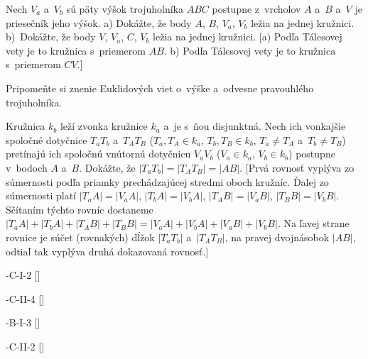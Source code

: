 {
Nech $V_a$ a~$V_b$ sú päty výšok trojuholníka $ABC$ postupne z~vrcholov
$A$ a~$B$ a~$V$ je priesečník jeho výšok. a) Dokážte, že body $A$, $B$,
$V_a$, $V_b$ ležia na jednej kružnici. b)~Dokážte, že body $V$, $V_a$, $C$,
$V_b$ ležia na jednej kružnici. [a) Podľa Tálesovej vety je to kružnica
s~priemerom $AB$. b) Podľa Tálesovej vety je to kružnica s~priemerom
$CV$.]

Pripomeňte si znenie Euklidových viet o~výške a~odvesne pravouhlého
trojuholníka.

Kružnica $k_b$ leží zvonka kružnice $k_a$ a~je s~ňou disjunktná. Nech
ich vonkajšie spoločné dotyčnice $T_aT_b$ a~$T_AT_B$ ($T_a, T_A\in k_a$,
$T_b, T_B\in k_b$, $T_a\ne T_A$ a~$T_b\ne T_B$) pretínajú ich
spoločnú vnútornú dotyčnicu $V_aV_b$ ($V_a\in k_a$, $V_b\in k_b$) postupne
v~bodoch $A$ a~$B$. Dokážte, že $|T_aT_b|= |T_AT_B|=|AB|$. [Prvá
rovnosť vyplýva zo súmernosti podľa priamky prechádzajúcej stredmi oboch
kružníc. Ďalej zo súmernosti platí $|T_aA|=|V_aA|$, $|T_bA|=|V_bA|$,
$|T_AB|=|V_aB|$, $|T_BB|=|V_bB|$. Sčítaním týchto rovníc dostaneme
$|T_aA|+|T_bA|+|T_AB|+|T_BB|=|V_aA|+|V_bA|+|V_aB|+|V_bB|$. Na ľavej
strane rovnice je súčet (rovnakých) dĺžok $|T_aT_b|$ a~$|T_AT_B|$, na
pravej dvojnásobok $|AB|$, odtiaľ tak vyplýva druhá dokazovaná rovnosť.]

\D
-C-I-2
[]

-C-II-4
[]

-B-I-3
[]

-C-II-2
[]

}
